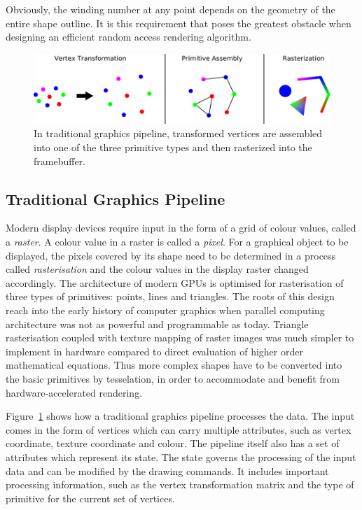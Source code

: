 \documentclass[11pt,a4paper,twoside]{article}
\begin{document}
Obviously, the winding number at any point depends on the geometry of the entire shape outline. It is this requirement that poses the greatest obstacle when designing an efficient random access rendering algorithm.

\begin {figure}
	\centering
	\includegraphics [width=1.0\columnwidth]{figures/gfx_pipeline}
	\caption {In traditional graphics pipeline, transformed vertices are assembled into one of the three primitive types and then rasterized into the framebuffer.}
	\label {fig:gfx_pipeline}
\end {figure}

\subsection{Traditional Graphics Pipeline}

Modern display devices require input in the form of a grid of colour values, called a \emph{raster}. A colour value in a raster is called a \emph{pixel}. For a graphical object to be displayed, the pixels covered by its shape need to be determined in a process called \emph{rasterisation} and the colour values in the display raster changed accordingly. The architecture of modern GPUs is optimised for rasterisation of three types of primitives: points, lines and triangles. The roots of this design reach into the early history of computer graphics when parallel computing architecture was not as powerful and programmable as today. Triangle rasterisation coupled with texture mapping of raster images was much simpler to implement in hardware compared to direct evaluation of higher order mathematical equations. Thus more complex shapes have to be converted into the basic primitives by tesselation, in order to accommodate and benefit from hardware-accelerated rendering.

Figure~\ref{fig:gfx_pipeline} shows how a traditional graphics pipeline processes the data. The input comes in the form of vertices which can carry multiple attributes, such as vertex coordinate, texture coordinate and colour. The pipeline itself also has a set of attributes which represent its state. The state governs the processing of the input data and can be modified by the drawing commands. It includes important processing information, such as the vertex transformation matrix and the type of primitive for the current set of vertices.
\end{document}
